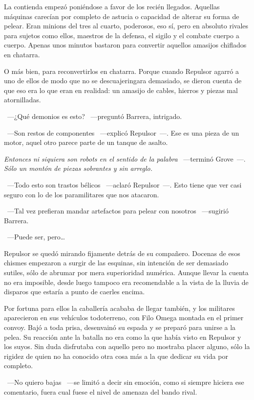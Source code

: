 La contienda empezó poniéndose a favor de los recién llegados. Aquellas máquinas carecían por completo de astucia o capacidad de alterar su forma de pelear. Eran minions del tres al cuarto, poderosos, eso sí, pero en absoluto rivales para sujetos como ellos, maestros de la defensa, el sigilo y el combate cuerpo a cuerpo. Apenas unos minutos bastaron para convertir aquellos amasijos chiflados en chatarra.

O más bien, para reconvertirlos en chatarra. Porque cuando Repulsor agarró a uno de ellos de modo que no se descuajeringara demasiado, se dieron cuenta de que eso era lo que eran en realidad: un amasijo de cables, hierros y piezas mal atornilladas.

~---¿Qué demonios es esto? ~---preguntó Barrera, intrigado.

~---Son restos de componentes ~---explicó Repulsor~---. Ese es una pieza de un motor, aquel otro parece parte de un tanque de asalto.

\emph{Entonces ni siquiera son robots en el sentido de la palabra} ~---terminó Grove~---. \emph{Sólo un montón de piezas sobrantes y sin arreglo.}

~---Todo esto son trastos bélicos ~---aclaró Repulsor~---. Esto tiene que ver casi seguro con lo de los paramilitares que nos atacaron.

~---Tal vez prefieran mandar artefactos para pelear con nosotros ~---sugirió Barrera.

~---Puede ser, pero\dots

Repulsor se quedó mirando fijamente detrás de su compañero. Docenas de esos chismes empezaron a surgir de las esquinas, sin intención de ser demasiado sutiles, sólo de abrumar por mera superioridad numérica. Aunque llevar la cuenta no era imposible, desde luego tampoco era recomendable a la vista de la lluvia de disparos que estaría a punto de caerles encima.

Por fortuna para ellos la caballería acababa de llegar también, y los militares aparecieron en sus vehículos todoterreno, con Filo Omega montada en el primer convoy. Bajó a toda prisa, desenvainó su espada y se preparó para unirse a la pelea. Su reacción ante la batalla no era como la que había visto en Repulsor y los suyos. Sin duda disfrutaba con aquello pero no mostraba placer alguno, sólo la rigidez de quien no ha conocido otra cosa más a la que dedicar su vida por completo.

~---No quiero bajas ~---se limitó a decir sin emoción, como si siempre hiciera ese comentario, fuera cual fuese el nivel de amenaza del bando rival.

